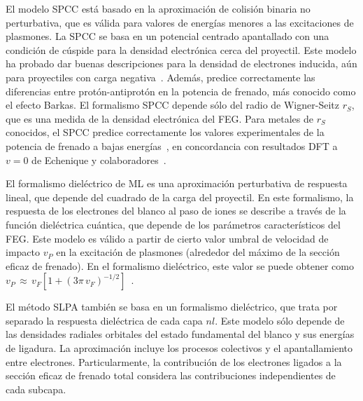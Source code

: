El modelo SPCC está basado en la aproximación de colisión binaria no 
perturbativa, que es válida para valores de energías menores a las 
excitaciones de plasmones. La SPCC se basa en un potencial centrado 
apantallado con una condición de cúspide para la densidad electrónica 
cerca del proyectil. Este modelo ha probado dar buenas descripciones 
para la densidad de electrones inducida, aún para proyectiles con carga 
negativa~\cite{Montanari:17}. Además, predice correctamente las 
diferencias entre protón-antiprotón en la potencia de frenado, más 
conocido como el efecto Barkas. El formalismo SPCC depende sólo del 
radio de Wigner-Seitz $r_S$, que es una medida de la densidad 
electrónica del FEG. Para metales de $r_S$ conocidos, el SPCC predice 
correctamente los valores experimentales de la potencia de frenado a 
bajas energías~\cite{Montanari:17}, en concordancia con resultados DFT 
a $v=0$ de Echenique y colaboradores~\cite{Echenique:81,Nagy:89}.

El formalismo dieléctrico de ML es una aproximación perturbativa de 
respuesta lineal, que depende del cuadrado de la carga del proyectil. En 
este formalismo, la respuesta de los electrones del blanco al paso de 
iones se describe a través de la función dieléctrica cuántica, que 
depende de los parámetros característicos del FEG. Este modelo es válido 
a partir de cierto valor umbral de velocidad de impacto $v_P$ en la 
excitación de plasmones (alrededor del máximo de la sección eficaz de 
frenado). En el formalismo dieléctrico, este valor se puede obtener como 
$v_P\,\approx\,v_F[1+(3\pi\,v_F)^{-1/2}]$~\cite{suppression}. 

El método SLPA también se basa en un formalismo dieléctrico, que trata 
por separado la respuesta dieléctrica de cada capa $nl$. Este modelo 
sólo depende de las densidades radiales orbitales del estado fundamental 
del blanco y sus energías de ligadura. La aproximación incluye los 
procesos colectivos y el apantallamiento entre electrones. 
Particularmente, la contribución de los electrones ligados a la sección 
eficaz de frenado total considera las contribuciones independientes de 
cada subcapa. 

